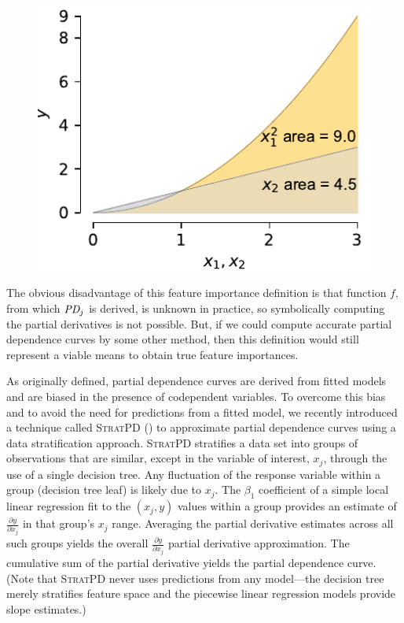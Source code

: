 \documentclass[twoside,11pt]{article}
\newcommand{\spd}{\fontfamily{cmr}\textsc{\small StratPD}}
\begin{document}
\begin{figure}[htbp]
\begin{center}
\includegraphics[scale=0.6]{images/quadratic-auc.pdf}
\label{fig:quad-area}
\end{center}
\end{figure}

The obvious disadvantage of this feature importance definition is that function $f$, from which $\text{\it PD}_j$ is derived, is unknown in practice, so symbolically computing the partial derivatives is not possible. But, if we could compute accurate partial dependence curves by some other method, then this definition would still represent a viable means to obtain true feature importances. 

As originally defined, partial dependence curves are derived from fitted models and are biased in the presence of codependent variables.  To overcome this bias and to avoid the need for predictions from a fitted model, we recently introduced a technique called \spd{} (\cite{stratpd}) to approximate partial dependence curves using a data stratification approach. \spd{} stratifies a data set into groups of observations that are similar, except in the variable of interest, $x_j$, through the use of a single decision tree. Any fluctuation of the response variable within a group (decision tree leaf) is likely due to $x_j$. The $\beta_1$ coefficient of a simple local linear regression fit to the $(x_j, y)$ values within a group provides an estimate of $\frac{\partial y}{\partial x_j}$ in that group's $x_j$ range. Averaging the partial derivative estimates across all such groups yields the overall $\frac{\partial y}{\partial x_j}$ partial derivative approximation. The cumulative sum of the partial derivative yields the partial dependence curve. (Note that \spd{} never uses predictions from any model---the decision tree merely stratifies feature space and the piecewise linear regression models provide slope estimates.)
\end{document}
